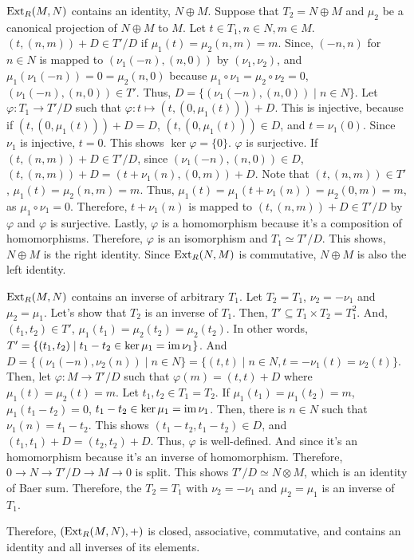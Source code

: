 \(\textnormal{Ext}_R(M, N)\) contains an identity, \(N \oplus M\).
Suppose that \(T_2 = N \oplus M\) and \(\mu_2\) be a canonical projection of \(N \oplus M\) to \(M\).
Let \(t \in T_1, n \in N, m \in M\).
\((t, (n, m)) + D \in T' / D\) if \(\mu_1(t) = \mu_2(n, m) = m\).
Since, \((-n, n)\) for \(n \in N\) is mapped to \((\nu_1(-n), (n, 0))\) by \((\nu_1, \nu_2)\),
and \(\mu_1(\nu_1(-n)) = 0 = \mu_2(n, 0)\) because \(\mu_1 \circ \nu_1 = \mu_2 \circ \nu_2 = 0\),
\((\nu_1(-n), (n, 0)) \in T'\).
Thus, \(D = \{(\nu_1(-n), (n, 0)) \mid n \in N\}\).
Let \(\varphi: T_1 \to T' / D\) such that \(\varphi: t \mapsto (t, (0, \mu_1(t))) + D\).
This is injective, because if \((t, (0, \mu_1(t))) + D = D\),
\((t, (0, \mu_1(t))) \in D\),
and \(t = \nu_1(0)\).
Since \(\nu_1\) is injective, \(t = 0\).
This shows \(\ker \varphi = \{0\}\).
\(\varphi\) is surjective.
If \((t, (n, m)) + D \in T' / D\),
since \((\nu_1(-n), (n, 0)) \in D\),
\((t, (n, m)) + D = (t + \nu_1(n), (0, m)) + D\).
Note that \((t, (n, m)) \in T'\), \(\mu_1(t) = \mu_2(n, m) = m\).
Thus, \(\mu_1(t) = \mu_1(t + \nu_1(n)) = \mu_2(0, m) = m\), as \(\mu_1 \circ \nu_1 = 0\).
Therefore, \(t + \nu_1(n)\) is mapped to \((t, (n, m)) + D \in T' / D\) by \(\varphi\)
and \(\varphi\) is surjective.
Lastly, \(\varphi\) is a homomorphism because it's a composition of homomorphisms.
Therefore, \(\varphi\) is an isomorphism and
\(T_1 \simeq T' / D\).
This shows, \(N \oplus M\) is the right identity.
Since \(\textnormal{Ext}_R(N, M)\) is commutative, \(N \oplus M\) is also the left identity.

\(\textnormal{Ext}_R(M, N)\) contains an inverse of arbitrary \(T_1\).
Let \(T_2 = T_1\), \(\nu_2 = -\nu_1\) and \(\mu_2 = \mu_1\).
Let's show that \(T_2\) is an inverse of \(T_1\).
Then, \(T' \subseteq T_1 \times T_2 = T_1^2\).
And, \((t_1, t_2) \in T'\), \(\mu_1(t_1) = \mu_2(t_2) = \mu_2(t_2)\).
In other words, \(T' = \{(t_1, t_2) \mid t_1 - t_2 \in \ker \mu_1 = \textnormal{im}\, \nu_1\}\).
And \(D = \{(\nu_1(-n), \nu_2(n)) \mid n \in N\} = \{(t, t) \mid n \in N, t = -\nu_1(t) = \nu_2(t)\}\).
Then, let \(\varphi: M \to T' / D\) such that \(\varphi(m) = (t, t) + D\) where \(\mu_1(t) = \mu_2(t) = m\).
Let \(t_1, t_2 \in T_1 = T_2\).
If \(\mu_1(t_1) = \mu_1(t_2) = m\),
\(\mu_1(t_1 - t_2) = 0\),
\(t_1 - t_2 \in \ker \mu_1 = \textnormal{im}\, \nu_1\).
Then, there is \(n \in N\) such that \(\nu_1(n) = t_1 - t_2\).
This shows \((t_1 - t_2, t_1 - t_2) \in D\), and \((t_1, t_1) + D = (t_2, t_2) + D\).
Thus, \(\varphi\) is well-defined.
And since it's an homomorphism because it's an inverse of homomorphism.
Therefore, \(0 \to N \to T'/D \to M \to 0\) is split.
This shows \(T'/D \simeq N \otimes M\), which is an identity of Baer sum.
Therefore, the \(T_2 = T_1\) with \(\nu_2 = -\nu_1\) and \(\mu_2 = \mu_1\) is an inverse of \(T_1\).

Therefore, \((\textnormal{Ext}_R(M, N), +)\) is closed, associative, commutative, and contains an identity and all inverses of its elements.
\qedsq
